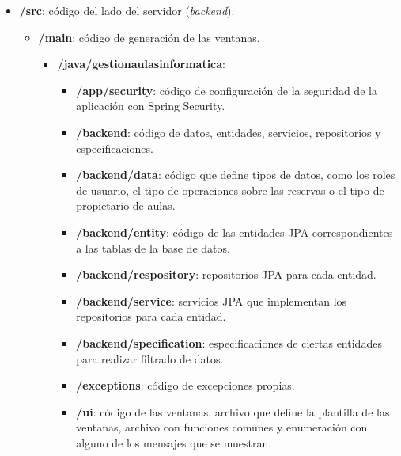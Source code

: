 \begin{itemize}
    \item \textbf{/src}: código del lado del servidor (\textit{backend}).
        \begin{itemize}
    	\tightlist
        	\item \textbf{/main}: código de generación de las ventanas.
        	
        	    \begin{itemize}
                	\item \textbf{/java/gestionaulasinformatica}: 
                	
                    	\begin{itemize}
                        	\item \textbf{/app/security}: código de configuración de la seguridad de la aplicación con Spring Security.
                        	
                        	\item \textbf{/backend}: código de datos, entidades, servicios, repositorios y especificaciones.
                	
                        	\item \textbf{/backend/data}: código que define tipos de datos, como los roles de usuario, el tipo de operaciones sobre las reservas o el tipo de propietario de aulas.
                        	
                        	\item \textbf{/backend/entity}: código de las entidades JPA correspondientes a las tablas de la base de datos.
                        	
                        	\item \textbf{/backend/respository}: repositorios JPA para cada entidad.
                        	
                        	\item \textbf{/backend/service}: servicios JPA que implementan los repositorios para cada entidad.
                        	
                        	\item \textbf{/backend/specification}: especificaciones de ciertas entidades para realizar filtrado de datos.
                        	
                        	\item \textbf{/exceptions}: código de excepciones propias.
                        	
                        	\item \textbf{/ui}: código de las ventanas, archivo que define la plantilla de las ventanas, archivo con funciones comunes y enumeración con alguno de los mensajes que se muestran.
                            

\end{itemize}
\end{itemize}
\end{itemize}
\end{itemize}
